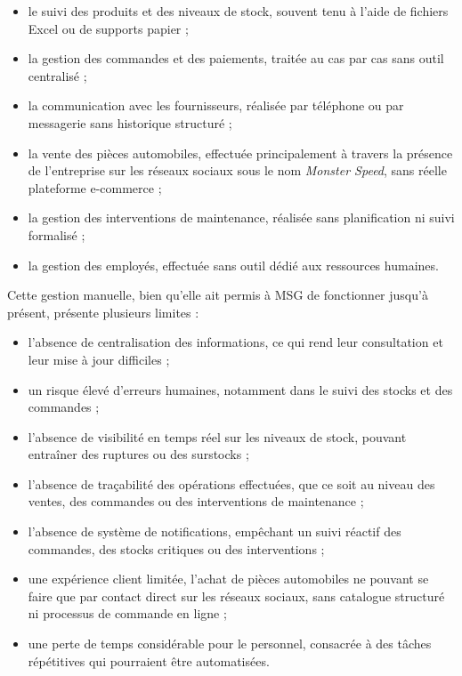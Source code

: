 \begin{itemize}
    \item le suivi des produits et des niveaux de stock, souvent tenu à l'aide de fichiers Excel ou de supports papier ;
    \item la gestion des commandes et des paiements, traitée au cas par cas sans outil centralisé ;
    \item la communication avec les fournisseurs, réalisée par téléphone ou par messagerie sans historique structuré ;
    \item la vente des pièces automobiles, effectuée principalement à travers la présence de l'entreprise sur les réseaux sociaux sous le nom \textit{Monster Speed}, sans réelle plateforme e-commerce ;
    \item la gestion des interventions de maintenance, réalisée sans planification ni suivi formalisé ;
    \item la gestion des employés, effectuée sans outil dédié aux ressources humaines.
\end{itemize}

Cette gestion manuelle, bien qu'elle ait permis à MSG de fonctionner jusqu'à présent, présente plusieurs limites :

\begin{itemize}
    \item l'absence de centralisation des informations, ce qui rend leur consultation et leur mise à jour difficiles ;
    \item un risque élevé d'erreurs humaines, notamment dans le suivi des stocks et des commandes ;
    \item l'absence de visibilité en temps réel sur les niveaux de stock, pouvant entraîner des ruptures ou des surstocks ;
    \item l'absence de traçabilité des opérations effectuées, que ce soit au niveau des ventes, des commandes ou des interventions de maintenance ;
    \item l'absence de système de notifications, empêchant un suivi réactif des commandes, des stocks critiques ou des interventions ;
    \item une expérience client limitée, l'achat de pièces automobiles ne pouvant se faire que par contact direct sur les réseaux sociaux, sans catalogue structuré ni processus de commande en ligne ;
    \item une perte de temps considérable pour le personnel, consacrée à des tâches répétitives qui pourraient être automatisées.
\end{itemize}

